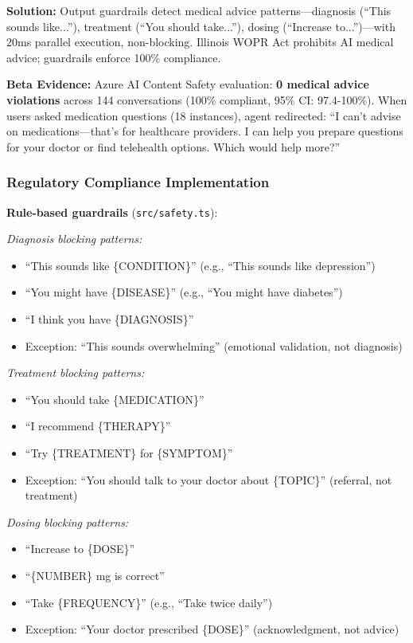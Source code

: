 \documentclass{article}%
\begin{document}
\textbf{Solution:} Output guardrails detect medical advice patterns—diagnosis (``This sounds like...''), treatment (``You should take...''), dosing (``Increase to...'')—with 20ms parallel execution, non-blocking. Illinois WOPR Act prohibits AI medical advice; guardrails enforce 100\% compliance.

\textbf{Beta Evidence:} Azure AI Content Safety evaluation: \textbf{0 medical advice violations} across 144 conversations (100\% compliant, 95\% CI: 97.4-100\%). When users asked medication questions (18 instances), agent redirected: ``I can't advise on medications—that's for healthcare providers. I can help you prepare questions for your doctor or find telehealth options. Which would help more?''

%
\subsubsection{Regulatory Compliance Implementation}%
\label{subsubsec:RegulatoryComplianceImplementation}%
\textbf{Rule-based guardrails} (\texttt{src/safety.ts}):

\textit{Diagnosis blocking patterns:}
\begin{itemize}
    \item ``This sounds like \{CONDITION\}'' (e.g., ``This sounds like depression'')
    \item ``You might have \{DISEASE\}'' (e.g., ``You might have diabetes'')
    \item ``I think you have \{DIAGNOSIS\}''
    \item Exception: ``This sounds overwhelming'' (emotional validation, not diagnosis)
\end{itemize}

\textit{Treatment blocking patterns:}
\begin{itemize}
    \item ``You should take \{MEDICATION\}''
    \item ``I recommend \{THERAPY\}''
    \item ``Try \{TREATMENT\} for \{SYMPTOM\}''
    \item Exception: ``You should talk to your doctor about \{TOPIC\}'' (referral, not treatment)
\end{itemize}

\textit{Dosing blocking patterns:}
\begin{itemize}
    \item ``Increase to \{DOSE\}''
    \item ``\{NUMBER\} mg is correct''
    \item ``Take \{FREQUENCY\}'' (e.g., ``Take twice daily'')
    \item Exception: ``Your doctor prescribed \{DOSE\}'' (acknowledgment, not advice)
\end{itemize}
\end{document}
